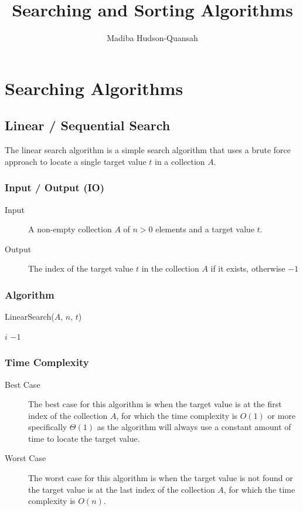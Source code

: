 \documentclass[12pt letter]{report}
\title{\Huge{Searching and Sorting Algorithms}}
\author{\huge{Madiba Hudson-Quansah}}
\date{}
\begin{document}
\maketitle
\newpage
{}
\tableofcontents
\pagebreak

\chapter{Searching Algorithms}

\section{Linear / Sequential Search}

The linear search algorithm is a simple search algorithm  that uses a brute force approach to locate a single target
value $t$ in a collection $A$.

\subsection{Input / Output (IO)}

\begin{description}
  \item[Input] A non-empty collection $A$ of $n > 0$ elements and a target value $t$.
  \item[Output] The index of the target value $t$ in the collection $A$ if it exists, otherwise $-1$
\end{description}

\subsection{Algorithm}

\begin{algorithm}[H]
  \caption{LinearSearch($A$, $n$, $t$)}
  \begin{algorithmic}[1]
    \State \Return $i$
    \EndIf
    \State \Return $-1$
    \EndFor
  \end{algorithmic}
\end{algorithm}

\subsection{Time Complexity}

\begin{description}
  \item[Best Case] The best case for this algorithm is when the target value is at the first index of the collection
        $A$, for which the time complexity is $O(1)$ or more specifically $\Theta \left( 1 \right) $ as the algorithm will
        always use a constant amount of time to locate the target value.
  \item[Worst Case] The worst case for this algorithm is when the target value is not found or the target value is
        at the last index of the collection $A$, for which the time complexity is $O(n)$.
\end{description}
\end{document}
